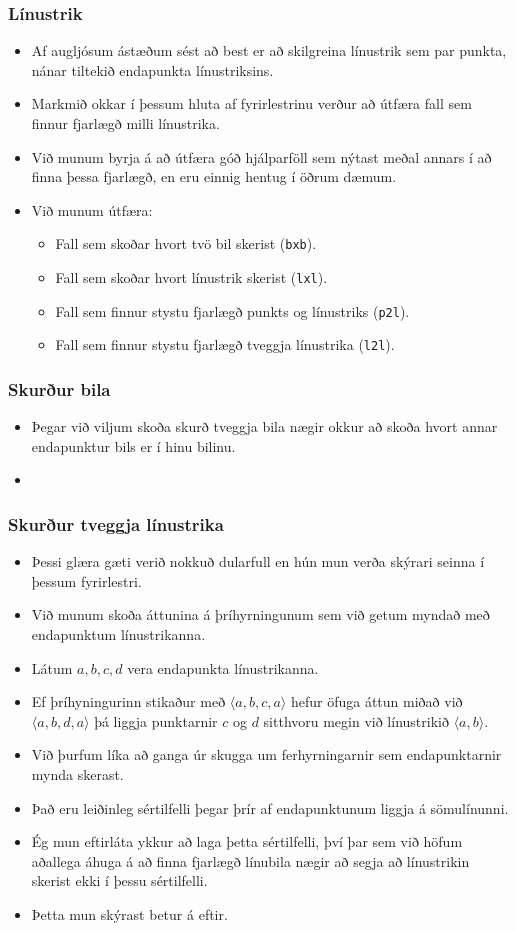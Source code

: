 \documentclass{beamer}
\newcommand\env[2]
{
	\begin{#1}
	#2
	\end{#1}
}
\newcommand\code[1]{\tiny}
\begin{document}
\env{frame}
{
	\frametitle{Línustrik}
	\env{itemize}
	{
		\item<1-> Af augljósum ástæðum sést að best er að skilgreina línustrik sem par punkta, nánar tiltekið endapunkta línustriksins.
		\item<2-> Markmið okkar í þessum hluta af fyrirlestrinu verður að útfæra fall sem finnur fjarlægð milli línustrika.
		\item<3-> Við munum byrja á að útfæra góð hjálparföll sem nýtast meðal annars í að finna þessa fjarlægð, en eru einnig
			hentug í öðrum dæmum.
		\item<4-> Við munum útfæra:
		\env{itemize}
		{
			\item<5-> Fall sem skoðar hvort tvö bil skerist (\texttt{bxb}).
			\item<6-> Fall sem skoðar hvort línustrik skerist (\texttt{lxl}).
			\item<7-> Fall sem finnur stystu fjarlægð punkts og línustriks (\texttt{p2l}).
			\item<8-> Fall sem finnur stystu fjarlægð tveggja línustrika (\texttt{l2l}).
		}
	}
}

\env{frame}
{
	\frametitle{Skurður bila}
	\env{itemize}
	{
		\item<1-> Þegar við viljum skoða skurð tveggja bila nægir okkur að skoða hvort annar endapunktur bils er í hinu bilinu.
		\item<2-> \code{bxb.h}
	}
}

\env{frame}
{
	\frametitle{Skurður tveggja línustrika}
	\env{itemize}
	{
		\small
		\item<1-> Þessi glæra gæti verið nokkuð dularfull en hún mun verða skýrari seinna í þessum fyrirlestri.
		\item<2-> Við munum skoða áttunina á þríhyrningunum sem við getum myndað með endapunktum línustrikanna.
		\item<3-> Látum $a, b, c, d$ vera endapunkta línustrikanna.
		\item<4-> Ef þríhyningurinn stikaður með $\langle a, b, c, a \rangle$ hefur öfuga áttun miðað við $\langle a, b, d, a \rangle$ þá liggja
			punktarnir $c$ og $d$ sitthvoru megin við línustrikið $\langle a, b \rangle$.
		\item<5-> Við þurfum líka að ganga úr skugga um ferhyrningarnir sem endapunktarnir mynda skerast.
		\item<6-> Það eru leiðinleg sértilfelli þegar þrír af endapunktunum liggja á sömulínunni.
		\item<7-> Ég mun eftirláta ykkur að laga þetta sértilfelli, því þar sem við höfum aðallega
			áhuga á að finna fjarlægð línubila nægir að segja að línustrikin skerist ekki í þessu sértilfelli.
		\item<8-> Þetta mun skýrast betur á eftir.
	}
}
\end{document}
